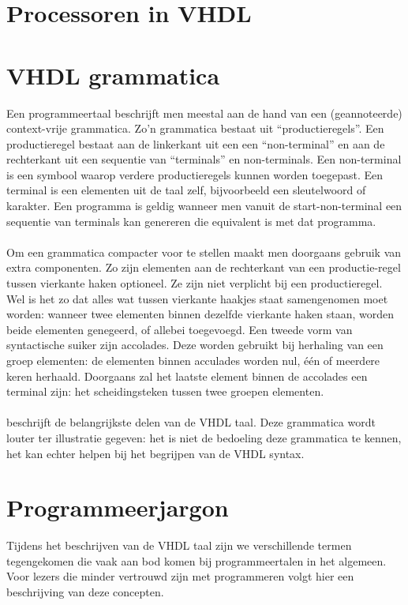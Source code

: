 \section{Processoren in VHDL}

\section{VHDL grammatica}
Een programmeertaal beschrijft men meestal aan de hand van een (geannoteerde) context-vrije grammatica. Zo'n grammatica bestaat uit ``productieregels''. Een productieregel bestaat aan de linkerkant uit een een ``non-terminal'' en aan de rechterkant uit een sequentie van ``terminals'' en non-terminals. Een non-terminal is een symbool waarop verdere productieregels kunnen worden toegepast. Een terminal is een elementen uit de taal zelf, bijvoorbeeld een sleutelwoord of karakter. Een programma is geldig wanneer men vanuit de start-non-terminal een sequentie van terminals kan genereren die equivalent is met dat programma.

\paragraph{}
Om een grammatica compacter voor te stellen maakt men doorgaans gebruik van extra componenten. Zo zijn elementen aan de rechterkant van een productie-regel tussen vierkante haken optioneel. Ze zijn niet verplicht bij een productieregel. Wel is het zo dat alles wat tussen vierkante haakjes staat samengenomen moet worden: wanneer twee elementen binnen dezelfde vierkante haken staan, worden beide elementen genegeerd, of allebei toegevoegd. Een tweede vorm van syntactische suiker zijn accolades. Deze worden gebruikt bij herhaling van een groep elementen: de elementen binnen acculades worden nul, \'e\'en of meerdere keren herhaald. Doorgaans zal het laatste element binnen de accolades een terminal zijn: het scheidingsteken tussen twee groepen elementen.

\paragraph{}
 beschrijft de belangrijkste delen van de VHDL taal. Deze grammatica wordt louter ter illustratie gegeven: het is niet de bedoeling deze grammatica te kennen, het kan echter helpen bij het begrijpen van de VHDL syntax.

\section{Programmeerjargon}
Tijdens het beschrijven van de VHDL taal zijn we verschillende termen tegengekomen die vaak aan bod komen bij programmeertalen in het algemeen. Voor lezers die minder vertrouwd zijn met programmeren volgt hier een beschrijving van deze concepten.

